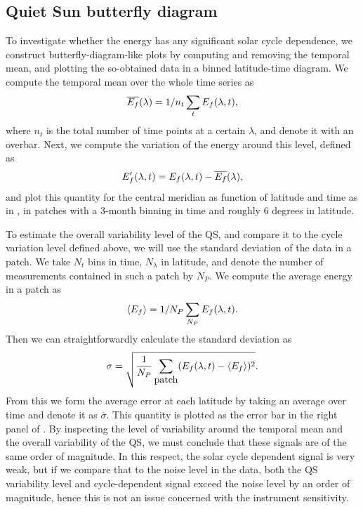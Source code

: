 \documentclass{aa}
\begin{document}
\subsection{Quiet Sun \fff butterfly diagram}\label{qsf}

To investigate whether the \fff energy has any significant solar cycle dependence, we construct butterfly-diagram-like plots by computing and removing the temporal mean, and plotting the so-obtained data in a binned latitude-time diagram. 
We compute the temporal mean over the whole time series as 
\begin{equation}
    \overline{E_f}(\lambda) = 1/n_t \sum_t E_f(\lambda,t),
\end{equation}
where $n_t$ is the total number of time points at a certain $\lambda$, and denote it with an overbar. Next, we compute the variation of the \fff energy around this level, defined as
\begin{equation}
    E_f'(\lambda,t)=E_f(\lambda,t)-\overline{E_f}(\lambda),
\end{equation}
and plot this quantity
for the central meridian
as function of latitude and time as in , 
in patches 
with a 3-month binning in time and roughly 6 degrees in latitude. 

To estimate 
the overall variability level of the QS, and compare it to the cycle variation level defined above,
we will use the standard deviation of the data in a patch.
We take $N_t$ bins in time, $N_\lambda$ in latitude, and denote the number of \ef measurements contained in such a patch by $N_P$. We compute the average \fff energy in a patch as
\begin{equation}
\langle E_f \rangle=1/N_P \sum_{N_P} E_f (\lambda,t).
\end{equation}
Then we can straightforwardly calculate the standard deviation as
\begin{equation}
\sigma= \sqrt{\frac{1}{N_P}\sum_{\mbox{patch}} ( E_f(\lambda,t)
- \left<{E_f} \right>)^2}.
\end{equation}
From this we form the average error at each latitude by taking an average over time and denote it as $\overline{\sigma}$. 
This quantity is plotted as the error bar in the right panel of 
.
By inspecting the level of variability around the temporal mean and the 
overall variability of the QS, we must conclude that these signals are of the same order of magnitude. 
In this respect, the solar cycle dependent signal is very weak, but if we compare that to the noise level in the data, both the QS variability level and cycle-dependent signal exceed the noise level by an order of magnitude, hence this is not an issue concerned with the instrument sensitivity.
\end{document}
